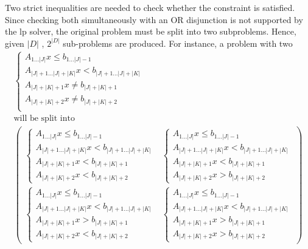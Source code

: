 \documentclass[runningheads]{llncs}
\begin{document}
Two strict inequalities are needed to check whether the constraint is satisfied.
Since checking both simultaneously with an OR disjunction is not supported by the \gls{lp} solver, the original problem must be split into two subproblems.
Hence, given $|D|$ \nqcs, $2^{|D|}$ sub-problems are produced.
For instance, a problem with two \nqcs
\begin{gather*}
    \begin{cases}
        A_{1 \dots |J|} x \le b_{1 \dots |J| - 1}                 \\
        A_{|J| + 1\dots |J| + |K|} x < b_{|J| + 1\dots |J| + |K|} \\
        A_{|J| + |K| + 1} x \ne b_{|J| + |K| + 1}                 \\
        A_{|J| + |K| + 2} x \ne b_{|J| + |K| + 2}                 \\
    \end{cases}
    \\
    \text{will be split into}
    \\
    \begin{pmatrix}
        \begin{cases}
            A_{1 \dots |J|} x \le b_{1 \dots |J| - 1}                 \\
            A_{|J| + 1\dots |J| + |K|} x < b_{|J| + 1\dots |J| + |K|} \\
            A_{|J| + |K| + 1} x < b_{|J| + |K| + 1}                   \\
            A_{|J| + |K| + 2} x < b_{|J| + |K| + 2}
        \end{cases}
         &
        \begin{cases}
            A_{1 \dots |J|} x \le b_{1 \dots |J| - 1}                 \\
            A_{|J| + 1\dots |J| + |K|} x < b_{|J| + 1\dots |J| + |K|} \\
            A_{|J| + |K| + 1} x < b_{|J| + |K| + 1}                   \\
            A_{|J| + |K| + 2} x > b_{|J| + |K| + 2}
        \end{cases}
        \\
        \begin{cases}
            A_{1 \dots |J|} x \le b_{1 \dots |J| - 1}                 \\
            A_{|J| + 1\dots |J| + |K|} x < b_{|J| + 1\dots |J| + |K|} \\
            A_{|J| + |K| + 1} x > b_{|J| + |K| + 1}                   \\
            A_{|J| + |K| + 2} x < b_{|J| + |K| + 2}
        \end{cases}
         &
        \begin{cases}
            A_{1 \dots |J|} x \le b_{1 \dots |J| - 1}                 \\
            A_{|J| + 1\dots |J| + |K|} x < b_{|J| + 1\dots |J| + |K|} \\
            A_{|J| + |K| + 1} x > b_{|J| + |K| + 1}                   \\
            A_{|J| + |K| + 2} x > b_{|J| + |K| + 2}
        \end{cases}
    \end{pmatrix}
\end{gather*}
\end{document}

